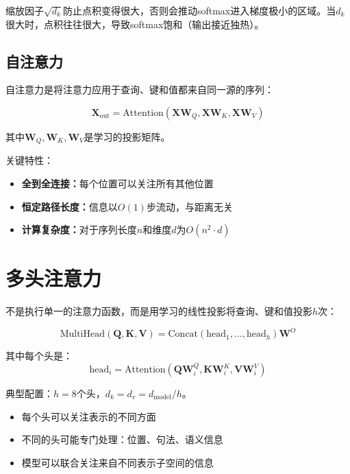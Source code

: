 \begin{note}[为什么要缩放？]
缩放因子$\sqrt{d_k}$防止点积变得很大，否则会推动softmax进入梯度极小的区域。当$d_k$很大时，点积往往很大，导致softmax饱和（输出接近独热）。
\end{note}

\subsection{自注意力}

自注意力是将注意力应用于查询、键和值都来自同一源的序列：

\begin{equation}
\mathbf{X}_{\text{out}} = \text{Attention}(\mathbf{X}\mathbf{W}_Q, \mathbf{X}\mathbf{W}_K, \mathbf{X}\mathbf{W}_V)
\end{equation}

其中$\mathbf{W}_Q, \mathbf{W}_K, \mathbf{W}_V$是学习的投影矩阵。

关键特性：
\begin{itemize}
    \item \textbf{全到全连接：}每个位置可以关注所有其他位置
    \item \textbf{恒定路径长度：}信息以$O(1)$步流动，与距离无关
    \item \textbf{计算复杂度：}对于序列长度$n$和维度$d$为$O(n^2 \cdot d)$
\end{itemize}

\section{多头注意力}

不是执行单一的注意力函数，而是用学习的线性投影将查询、键和值投影$h$次：

\begin{equation}
\text{MultiHead}(\mathbf{Q}, \mathbf{K}, \mathbf{V}) = \text{Concat}\left(\text{head}_1, \ldots, \text{head}_h\right)\mathbf{W}^O
\end{equation}

其中每个头是：
\begin{equation}
\text{head}_i = \text{Attention}\left(\mathbf{Q}\mathbf{W}_i^Q, \mathbf{K}\mathbf{W}_i^K, \mathbf{V}\mathbf{W}_i^V\right)
\end{equation}

典型配置：$h = 8$个头，$d_k = d_v = d_{\text{model}}/h$。

\begin{properties}[多头注意力的优势]
\begin{itemize}
    \item 每个头可以关注表示的不同方面
    \item 不同的头可能专门处理：位置、句法、语义信息
    \item 模型可以联合关注来自不同表示子空间的信息
\end{itemize}
\end{properties}

